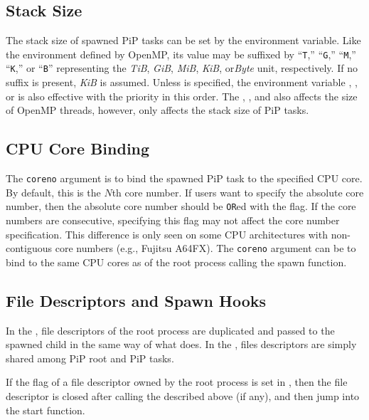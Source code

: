\subsection{Stack Size}

The stack size of spawned PiP tasks can be set by the
 environment variable. Like the
 environment defined by OpenMP, its value may 
be suffixed by ``{\tt T},'' ``{\tt G},'' ``{\tt M},'' ``{\tt K},'' or
``{\tt B}'' representing the {\it TiB}, {\it GiB}, {\it MiB}, {\it
  KiB}, or{\it Byte} unit, respectively. If no suffix is present,
{\it KiB} is assumed. Unless  is
specified, the environment variable ,
  , or  is also effective
  with the 
priority in this order.  The ,
, and  also affects the
size of OpenMP threads, however,  only affects
the stack size of PiP tasks. 

\subsection{CPU Core Binding}

The {\tt coreno} argument is to bind the spawned PiP task to the
specified CPU core. By default, this is the $N$th core number. If
users want to specify the absolute core number, then the absolute core
number should be {\tt OR}ed with the
 flag. If the core numbers are consecutive,
specifying this flag may not affect the core number
specification. This difference is only seen on some CPU architectures
with non-contiguous core numbers (e.g., Fujitsu A64FX).
The {\tt coreno} argument can be  to bind to
the same CPU cores as of the root process calling the spawn function.

\subsection{File Descriptors and Spawn Hooks}\label{sec:hooks}

In the , file descriptors of the root process
are duplicated and passed to the spawned child in the same way of what
 does. In the , files descriptors
are simply shared among PiP root and PiP tasks. 

If the  flag of a file descriptor owned by the root
process is set in , then the file descriptor is
closed after calling the  described above (if
any), and then jump into the start function.  

